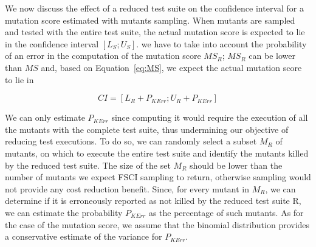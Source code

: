 We now discuss the effect of a reduced test suite on the confidence interval for a mutation score estimated with mutants sampling. When mutants are sampled and tested with the entire test suite, the actual mutation score is expected to lie in the confidence interval $[\mathit{L}_{S};\mathit{U}_{S}]$. 
we have to take into account the probability of an error in the computation of the mutation score $\mathit{MS}_R$;  $\mathit{MS}_R$ can be lower than $\mathit{MS}$ and, based on Equation~\ref{eq:MS}, we expect the actual mutation score to lie in 

\begin{equation}
\label{eq:CI}
\mathit{CI}=[\mathit{L}_{R}+P_\mathit{KErr};\mathit{U}_{R}+P_{\mathit{KErr}}]
\end{equation}

We can only estimate  $P_{\mathit{KErr}}$ since computing it would require the execution of all the mutants with the complete test suite, thus undermining our objective of reducing test executions. 
To do so, we can randomly select a subset $M_R$ of mutants, on which to execute the entire test suite and identify the mutants killed by the reduced test suite. %
The size of the set $M_R$ should be lower than the number of mutants we expect FSCI sampling to return, 
otherwise sampling would not provide any cost reduction benefit.
Since, for every mutant in $M_R$, we can determine if it is erroneously reported as not killed by the reduced test suite R,
we can 
estimate the probability $P_{\mathit{KErr}}$ as the percentage of such mutants.
As for the case of the mutation score, 
we assume that the binomial distribution provides a conservative estimate of the variance for $P_{\mathit{KErr}}$. 

